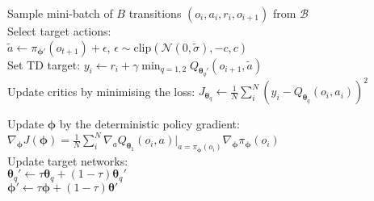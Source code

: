 \begin{algorithm}[hbt!]
{{        \vspace{0.3cm}
        
        Sample mini-batch of $B$ transitions $(o_i,a_i,r_i,o_{i+1})$ from $\mathcal{B}$ \\
        Select target actions:\\
        \nonl $\tilde{a} \leftarrow \pi_{\bm{\phi}'}(o_{t+1}) + \epsilon$, \hspace{0.2cm} $\epsilon \sim \text{clip}(\mathcal{N}(0,\tilde{\sigma}), -c,c)$ \\
        Set TD target:
        $y_i \leftarrow r_i + \gamma \min_{q=1,2} Q_{\bm{\theta}_q'}(o_{i+1}, \tilde{a})$ \\
        Update critics by minimising the loss:
        \nonl $J_{\bm{\theta}_q} \leftarrow  \frac{1}{N} \sum_{i}^{N} (y_i - Q_{\bm{\theta}_q}(o_i,a_i))^{2} $ \\

        \vspace{0.3cm}
        
        {
            Update $\bm{\phi}$ by the deterministic policy gradient: \\
            \nonl $\nabla_{\bm{\phi}} J(\bm{\phi}) = \frac{1}{N} \sum_{i}^{N} \nabla_a Q_{\bm{\theta}_1} (o_i,a) | _{a=\pi_{\bm{\phi}}(o_i)} \nabla_{\bm{\phi}} \pi_{\bm{\phi}}(o_i)$ \\
            Update target networks: \\
            $\bm{\theta}_{q}' \leftarrow \tau \bm{\theta}_q + (1 - \tau) \bm{\theta}_{q}'$ \\
            $\bm{\phi}' \leftarrow \tau \bm{\phi} + (1 - \tau) \bm{\theta}'$ \\
        }
    }
}
\end{algorithm}
